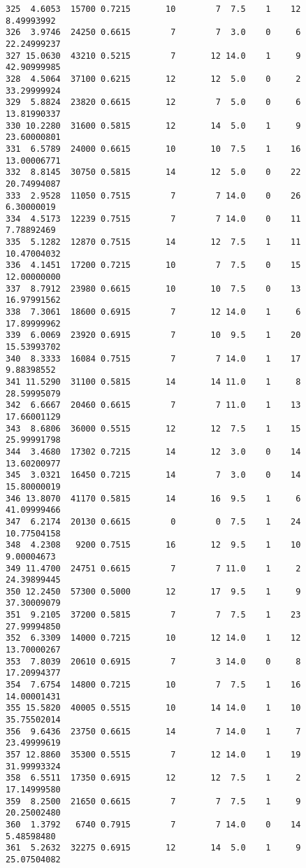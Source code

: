 \documentclass[
  letterpaper,
  DIV=11,
  numbers=noendperiod]{scrreprt}
\begin{document}
\begin{verbatim}
325  4.6053  15700 0.7215       10        7  7.5    1    12  8.49993992
326  3.9746  24250 0.6615        7        7  3.0    0     6 22.24999237
327 15.0630  43210 0.5215        7       12 14.0    1     9 42.90999985
328  4.5064  37100 0.6215       12       12  5.0    0     2 33.29999924
329  5.8824  23820 0.6615       12        7  5.0    0     6 13.81990337
330 10.2280  31600 0.5815       12       14  5.0    1     9 23.60000801
331  6.5789  24000 0.6615       10       10  7.5    1    16 13.00006771
332  8.8145  30750 0.5815       14       12  5.0    0    22 20.74994087
333  2.9528  11050 0.7515        7        7 14.0    0    26  6.30000019
334  4.5173  12239 0.7515        7        7 14.0    0    11  7.78892469
335  5.1282  12870 0.7515       14       12  7.5    1    11 10.47004032
336  4.1451  17200 0.7215       10        7  7.5    0    15 12.00000000
337  8.7912  23980 0.6615       10       10  7.5    0    13 16.97991562
338  7.3061  18600 0.6915        7       12 14.0    1     6 17.89999962
339  6.0069  23920 0.6915        7       10  9.5    1    20 15.53993702
340  8.3333  16084 0.7515        7        7 14.0    1    17  9.88398552
341 11.5290  31100 0.5815       14       14 11.0    1     8 28.59995079
342  6.6667  20460 0.6615        7        7 11.0    1    13 17.66001129
343  8.6806  36000 0.5515       12       12  7.5    1    15 25.99991798
344  3.4680  17302 0.7215       14       12  3.0    0    14 13.60200977
345  3.0321  16450 0.7215       14        7  3.0    0    14 15.80000019
346 13.8070  41170 0.5815       14       16  9.5    1     6 41.09999466
347  6.2174  20130 0.6615        0        0  7.5    1    24 10.77504158
348  4.2308   9200 0.7515       16       12  9.5    1    10  9.00004673
349 11.4700  24751 0.6615        7        7 11.0    1     2 24.39899445
350 12.2450  57300 0.5000       12       17  9.5    1     9 37.30009079
351  9.2105  37200 0.5815        7        7  7.5    1    23 27.99994850
352  6.3309  14000 0.7215       10       12 14.0    1    12 13.70000267
353  7.8039  20610 0.6915        7        3 14.0    0     8 17.20994377
354  7.6754  14800 0.7215       10        7  7.5    1    16 14.00001431
355 15.5820  40005 0.5515       10       14 14.0    1    10 35.75502014
356  9.6436  23750 0.6615       14        7 14.0    1     7 23.49999619
357 12.8860  35300 0.5515        7       12 14.0    1    19 31.99993324
358  6.5511  17350 0.6915       12       12  7.5    1     2 17.14999580
359  8.2500  21650 0.6615        7        7  7.5    1     9 20.25002480
360  1.3792   6740 0.7915        7        7 14.0    0    14  5.48598480
361  5.2632  32275 0.6915       12       14  5.0    1     9 25.07504082

\end{verbatim}
\end{document}
